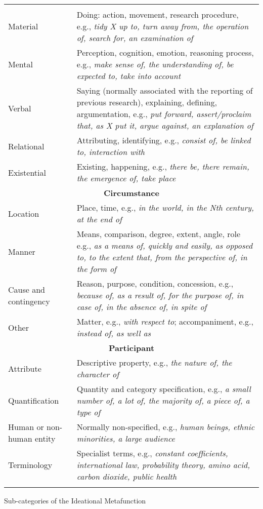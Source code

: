 \documentclass[output=paper]{langsci/langscibook}
\begin{document}
\begin{tabularx}{\textwidth}{XX}

\lsptoprule

\multicolumn{2}{c}{\textbf{Process}}\\
Material & Doing: action, movement, research procedure, e.g., \textit{tidy X up to, turn away from, the operation of, search for, an examination of}\\
Mental & Perception, cognition, emotion, reasoning process, e.g., \textit{make sense of, the understanding of, be expected to, take into account}\\
Verbal & Saying (normally associated with the reporting of previous research), explaining, defining, argumentation, e.g., \textit{put forward, assert/proclaim that, as X put it, argue against, an explanation of}\\
Relational & Attributing, identifying, e.g., \textit{consist of, be linked to, interaction with}\\
Existential & Existing, happening, e.g., \textit{there be, there remain, the emergence of, take place}\\
\multicolumn{2}{c}{\textbf{Circumstance}}\\
Location & Place, time, e.g., \textit{in the world, in the Nth century, at the end of}\\
Manner & Means, comparison, degree, extent, angle, role e.g., \textit{as a means of, quickly and easily, as opposed to, to the extent that, from the perspective of, in the form of}\\
Cause and contingency & Reason, purpose, condition, concession, e.g., \textit{because of, as a result of, for the purpose of, in case of, in the absence of, in spite of}\\
Other & Matter, e.g., \textit{with respect to}; accompaniment, e.g., \textit{instead of, as well as}\\
\multicolumn{2}{c}{\textbf{Participant}}\\
Attribute & Descriptive property, e.g., \textit{the nature of, the character of}\\
Quantification & Quantity and category specification, e.g., \textit{a small number of, a lot of, the majority of, a piece of, a type of}\\
Human or non-human entity & Normally non-specified, e.g., \textit{human beings, ethnic minorities, a large audience}\\
Terminology & Specialist terms, e.g., \textit{constant coefficients, international law, probability theory, amino acid, carbon dioxide, public health} \\
\lspbottomrule
\end{tabularx}
\begin{table}
\caption{Sub-categories of the Ideational Metafunction}
\label{tab:key:2}
\end{table}
\end{document}
